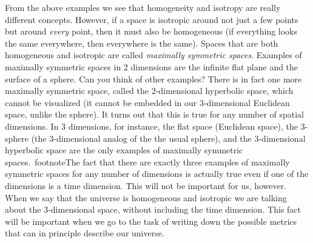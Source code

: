 \documentclass[11pt, a4paper,oneside,openright]{book}
\numberwithin{equation}{section}
\begin{document}
From the above examples we see that homogeneity and isotropy are really different concepts. However, if a space is isotropic around not just a few points but around {\it every} point, then it must also be homogeneous (if everything looks the same everywhere, then everywhere is the same). Spaces that are both homogeneous and isotropic are called {\it maximally symmetric spaces}. Examples of maximally symmetric spaces in 2 dimensions are the infinite flat plane and the surface of a sphere. Can you think of other examples? There is in fact one more maximally symmetric space, called the 2-dimensional hyperbolic space, which cannot be visualized (it cannot be embedded in our 3-dimensional Euclidean space, unlike the sphere). It turns out that this is true for any number of spatial dimensions. In 3 dimensions, for instance, the flat space (Euclidean space), the 3-sphere (the 3-dimensional analog of the the usual sphere), and the 3-dimensional hyperbolic space are the only examples of maximally symmetric spaces.\
footnote{The fact that there are exactly three examples of maximally symmetric spaces for any number of dimensions is actually true even if one of the dimensions is a time dimension. This will not be important for us, however. When we say that the universe is homogeneous and isotropic we are talking about the 3-dimensional space, without including the time dimension.} This fact will be important when we go to the task of writing down the possible metrics that can in principle describe our universe.
\end{document}
